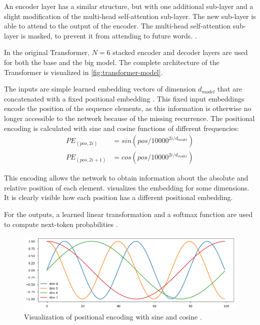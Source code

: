 An encoder layer has a similar structure, but with one additional sub-layer and a slight modification of the multi-head self-attention sub-layer.
The new sub-layer is able to attend to the output of the encoder.
The multi-head self-attention sub-layer is masked, to prevent it from attending to future words. \cite[p.~3]{1706.03762}.

In the original Transformer, $N = 6$ stacked encoder and decoder layers are used for both the base and the big model.
The complete architecture of the Transformer is visualized in \cref{fig:transformer-model}.

The inputs are simple learned embedding vectors of dimension $d_{model}$ that are concatenated with a fixed positional embedding \cite[p.~5--6]{1706.03762}.
This fixed input embeddings encode the position of the sequence elements, as this information is otherwise no longer accessible to the network because of the missing recurrence.
The positional encoding is calculated with sine and cosine functions of different frequencies:
\begin{align*} 
	PE_{(pos,2i)} & = sin(pos/10000^{2i/d_{model}}) \\
	PE_{(pos,2i+1)} & = cos(pos/10000^{2i/d_{model}})
\end{align*}

This encoding allows the network to obtain information about the absolute and relative position of each element.
 visualizes the embedding for some dimensions.
It is clearly visible how each position has a different positional embedding.

For the outputs, a learned linear transformation and a softmax function are used to compute next-token probabilities \cite[p.~5]{1706.03762}.

\begin{figure}[h]
\centering
\includegraphics[width=0.7\paperwidth]{figures/positional-encoding-sine-cosine}
\caption[Visualization of positional encoding with sine and cosine]{Visualization of positional encoding with sine and cosine \cite{annotated.transformer}.}
\label{fig:positional-encoding-sine-cosine}
\end{figure}

